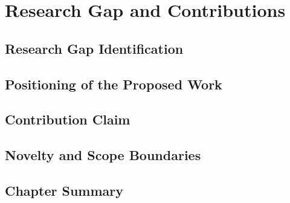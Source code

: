 \chapter{Research Gap and Contributions}
\section{Research Gap Identification}
\section{Positioning of the Proposed Work}
\section{Contribution Claim}
\section{Novelty and Scope Boundaries}
\section{Chapter Summary}
